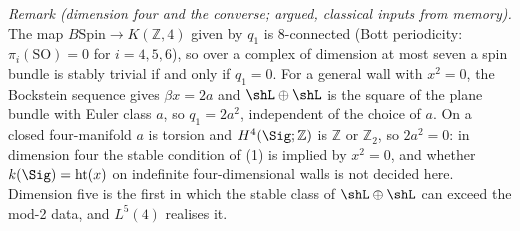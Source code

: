\emph{Remark (dimension four and the converse; argued, classical inputs from memory).} The map $B\mathrm{Spin} \to K(\mathbb{Z}, 4)$ given by $q_{1}$ is $8$-connected (Bott periodicity: $\pi_{i}(\mathrm{SO}) = 0$ for $i = 4, 5, 6$), so over a complex of dimension at most seven a spin bundle is stably trivial if and only if $q_{1} = 0$. For a general wall with $x^{2} = 0$, the Bockstein sequence gives $\beta x = 2a$ and $\shL \oplus \shL$ is the square of the plane bundle with Euler class $a$, so $q_{1} = 2a^{2}$, independent of the choice of $a$. On a closed four-manifold $a$ is torsion and $H^{4}(\Sig; \mathbb{Z})$ is $\mathbb{Z}$ or $\mathbb{Z}_{2}$, so $2a^{2} = 0$: in dimension four the stable condition of (1) is implied by $x^{2} = 0$, and whether $k(\Sig) = \operatorname{ht}(x)$ on indefinite four-dimensional walls is not decided here. Dimension five is the first in which the stable class of $\shL \oplus \shL$ can exceed the mod-2 data, and $L^{5}(4)$ realises it.
